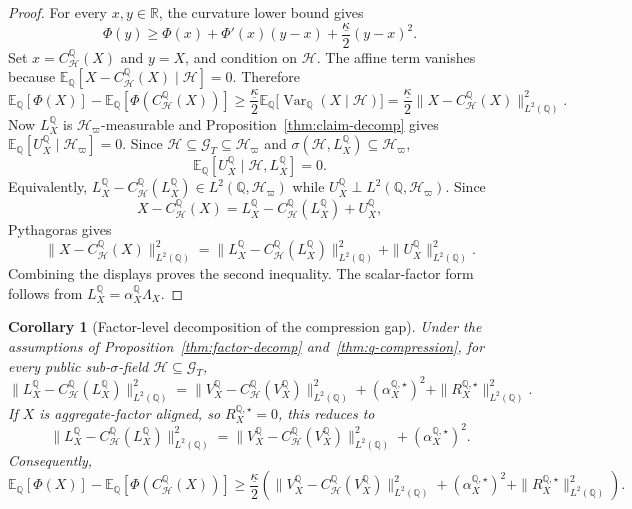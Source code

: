 \documentclass[11pt,a4paper]{amsart}
\theoremstyle{plain}
\newtheorem{corollary}[theorem]{Corollary}
\theoremstyle{definition}
\theoremstyle{remark}
\DeclareMathOperator{\Var}{Var}
\newcommand{\R}{\mathbb{R}}
\newcommand{\QQ}{\mathbb{Q}}
\newcommand{\EE}{\mathbb{E}}
\newcommand{\cG}{\mathcal{G}}
\newcommand{\cH}{\mathcal{H}}
\begin{document}
\begin{proof}
For every \(x,y\in\R\), the curvature lower bound gives
\[
        \Phi(y)
        \ge
        \Phi(x)+\Phi'(x)(y-x)+\frac{\underline\kappa}{2}(y-x)^2.
\]
Set \(x=C_{\cH}^\QQ(X)\) and \(y=X\), and condition on \(\cH\).  The affine term vanishes because
\(\EE_\QQ[X-C_{\cH}^\QQ(X)\mid\cH]=0\).  Therefore
\[
        \EE_\QQ[\Phi(X)]-\EE_\QQ[\Phi(C_{\cH}^\QQ(X))]
        \ge
        \frac{\underline\kappa}{2}\EE_\QQ\bigl[\Var_\QQ(X\mid \cH)\bigr]
        =
        \frac{\underline\kappa}{2}\|X-C_{\cH}^\QQ(X)\|_{L^2(\QQ)}^2.
\]
Now \(L_X^\QQ\) is \(\cH_\varpi\)-measurable and Proposition~\ref{thm:claim-decomp} gives
\(\EE_\QQ[U_X^\QQ\mid \cH_\varpi]=0\).  Since \(\cH\subseteq\cG_T\subseteq\cH_\varpi\) and
\(\sigma(\cH,L_X^\QQ)\subseteq \cH_\varpi\),
\[
        \EE_\QQ[U_X^\QQ\mid \cH,L_X^\QQ]=0.
\]
Equivalently, \(L_X^\QQ-C_{\cH}^\QQ(L_X^\QQ)\in L^2(\QQ,\cH_\varpi)\) while
\(U_X^\QQ\perp L^2(\QQ,\cH_\varpi)\).  Since
\[
        X-C_{\cH}^\QQ(X)
        =
        L_X^\QQ-C_{\cH}^\QQ(L_X^\QQ)+U_X^\QQ,
\]
Pythagoras gives
\[
        \|X-C_{\cH}^\QQ(X)\|_{L^2(\QQ)}^2
        =
        \|L_X^\QQ-C_{\cH}^\QQ(L_X^\QQ)\|_{L^2(\QQ)}^2
        +
        \|U_X^\QQ\|_{L^2(\QQ)}^2.
\]
Combining the displays proves the second inequality.  The scalar-factor form follows from
\(L_X^\QQ=\alpha_X^\QQ\Lambda_X\).
\end{proof}

\begin{corollary}[Factor-level decomposition of the compression gap]\label{cor:q-compression-factor}
Under the assumptions of Proposition~\ref{thm:factor-decomp} and~\ref{thm:q-compression}, for every
public sub-\(\sigma\)-field \(\cH\subseteq\cG_T\),
\[
        \|L_X^\QQ-C_{\cH}^\QQ(L_X^\QQ)\|_{L^2(\QQ)}^2
        =
        \|V_X^\QQ-C_{\cH}^\QQ(V_X^\QQ)\|_{L^2(\QQ)}^2
        +
        (\alpha_X^{\QQ,\star})^2
        +
        \|R_X^{\QQ,\star}\|_{L^2(\QQ)}^2.
\]
If \(X\) is aggregate-factor aligned, so \(R_X^{\QQ,\star}=0\), this reduces to
\[
        \|L_X^\QQ-C_{\cH}^\QQ(L_X^\QQ)\|_{L^2(\QQ)}^2
        =
        \|V_X^\QQ-C_{\cH}^\QQ(V_X^\QQ)\|_{L^2(\QQ)}^2
        +
        (\alpha_X^{\QQ,\star})^2.
\]
Consequently,
\[
        \EE_\QQ[\Phi(X)]
        -
        \EE_\QQ[\Phi(C_{\cH}^\QQ(X))]
        \ge
        \frac{\underline\kappa}{2}
        \left(
                \|V_X^\QQ-C_{\cH}^\QQ(V_X^\QQ)\|_{L^2(\QQ)}^2
                +
                (\alpha_X^{\QQ,\star})^2
                +
                \|R_X^{\QQ,\star}\|_{L^2(\QQ)}^2
        \right).
\]
\end{corollary}
\end{document}
